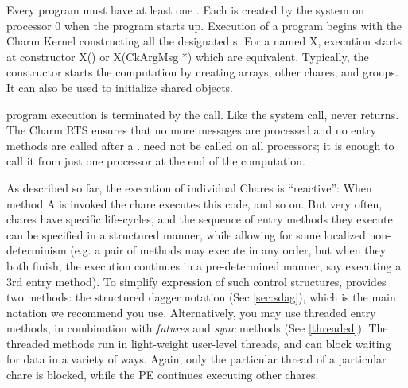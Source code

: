 Every \charm program must have at least one .  Each
 is created by the system on processor 0 when the \charm
program starts up.  Execution of a \charm program begins with the
Charm Kernel constructing all the designated s.  For
a  named X, execution starts at constructor X() or
X(CkArgMsg *) which are equivalent.  Typically, the
 constructor starts the computation by creating arrays, other
chares, and groups.  It can also be used to initialize shared 
objects.

\charm program execution is terminated by the  call.  Like the
 system call,  never returns. The Charm RTS ensures
that no more messages are processed and no entry methods are called after a
.  need not be called on all processors; it is enough
to call it from just one processor at the end of the computation.


As described so far, the execution of individual Chares is
``reactive'': When method A is invoked the chare executes this code,
and so on. But very often, chares have specific life-cycles, and the
sequence of entry methods they execute can be specified in a
structured manner, while allowing for some localized non-determinism
(e.g. a pair of methods may execute in any order, but when they both
finish, the execution continues in a pre-determined manner, say
executing a 3rd entry method). To simplify expression of such control
structures, \charm provides two methods: the structured dagger
notation (Sec \ref{sec:sdag}), which is the main notation we recommend
you use.  Alternatively, you may use threaded entry methods, in
combination with {\em futures} and {\em sync} methods
(See \ref{threaded}). The threaded methods run in light-weight
user-level threads, and can block waiting for data in a variety of
ways. Again, only the particular thread of a particular chare is
blocked, while the PE continues executing other chares.

